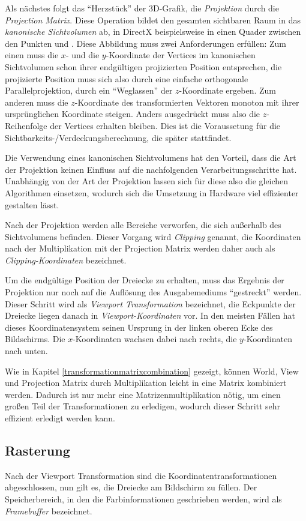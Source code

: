 Als nächstes folgt das \enquote{Herzstück} der 3D-Grafik, die \emph{Projektion} durch die \emph{Projection Matrix}. Diese Operation bildet den gesamten sichtbaren Raum in das \emph{kanonische Sichtvolumen} ab, in DirectX beispielsweise in einen Quader zwischen den Punkten  und . Diese Abbildung muss zwei Anforderungen erfüllen: Zum einen muss die $x$- und die $y$-Koordinate der Vertices im kanonischen Sichtvolumen schon ihrer endgültigen projizierten Position entsprechen, die projizierte Position muss sich also durch eine einfache orthogonale Parallelprojektion, durch ein \enquote{Weglassen} der $z$-Koordinate ergeben. Zum anderen muss die $z$-Koordinate des transformierten Vektoren monoton mit ihrer ursprünglichen Koordinate steigen. Anders ausgedrückt muss also die $z$-Reihenfolge der Vertices erhalten bleiben. Dies ist die Voraussetung für die Sichtbarkeits-/Verdeckungsberechnung, die später stattfindet.

Die Verwendung eines kanonischen Sichtvolumens hat den Vorteil, dass die Art der Projektion keinen Einfluss auf die nachfolgenden Verarbeitungsschritte hat. Unabhängig von der Art der Projektion lassen sich für diese also die gleichen Algorithmen einsetzen, wodurch sich die Umsetzung in Hardware viel effizienter gestalten lässt.

Nach der Projektion werden alle Bereiche verworfen, die sich außerhalb des Sichtvolumens befinden. Dieser Vorgang wird \emph{Clipping} genannt, die Koordinaten nach der Multiplikation mit der Projection Matrix werden daher auch als \emph{Clipping-Koordinaten} bezeichnet.

Um die endgültige Position der Dreiecke zu erhalten, muss das Ergebnis der Projektion nur noch auf die Auflösung des Ausgabemediums \enquote{gestreckt} werden. Dieser Schritt wird als \emph{Viewport Transformation} bezeichnet, die Eckpunkte der Dreiecke liegen danach in \emph{Viewport-Koordinaten} vor. In den meisten Fällen hat dieses Koordinatensystem seinen Ursprung in der linken oberen Ecke des Bildschirms. Die $x$-Koordinaten wachsen dabei nach rechts, die $y$-Koordinaten nach unten.

Wie in Kapitel \ref{transformationmatrixcombination} gezeigt, können World, View und Projection Matrix durch Multiplikation leicht in eine Matrix kombiniert werden. Dadurch ist nur mehr eine Matrizenmultiplikation nötig, um einen großen Teil der Transformationen zu erledigen, wodurch dieser Schritt sehr effizient erledigt werden kann.

\subsection{Rasterung}
Nach der Viewport Transformation sind die Koordinatentransformationen abgeschlossen, nun gilt es, die Dreiecke am Bildschirm zu füllen. Der Speicherbereich, in den die Farbinformationen geschrieben werden, wird als \emph{Framebuffer} bezeichnet.


